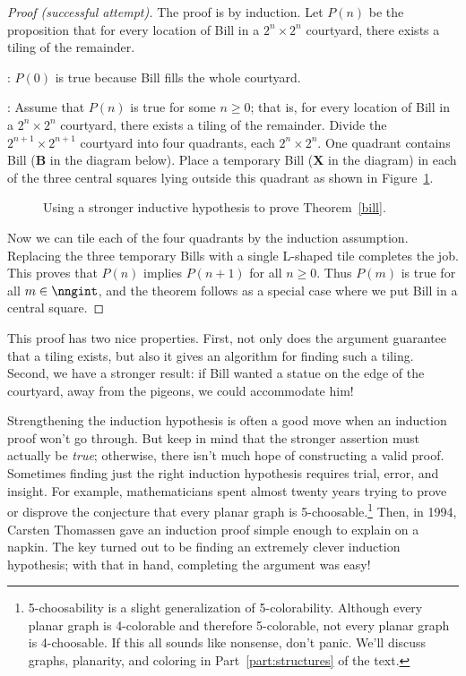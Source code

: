 \begin{proof}[Proof (successful attempt)]
The proof is by induction.  Let $P(n)$ be the proposition that for
every location of Bill in a $2^n \times 2^n$ courtyard, there exists a
tiling of the remainder.

: $P(0)$ is true because Bill fills the
whole courtyard.

: Assume that $P(n)$ is true for some
$n \geq 0$; that is, for every location of Bill in a $2^n \times 2^n$
courtyard, there exists a tiling of the remainder.  Divide the
$2^{n+1} \times 2^{n+1}$ courtyard into four quadrants, each $2^n
\times 2^n$.  One quadrant contains Bill (\textbf{B} in the diagram
below).  Place a temporary Bill (\textbf{X} in the diagram) in each of
the three central squares lying outside this quadrant as shown in
Figure~\ref{fig:stronger-bill}.

\begin{figure}


\caption{Using a stronger inductive hypothesis to prove
  Theorem~\ref{bill}.}
\label{fig:stronger-bill}
\end{figure}

Now we can tile each of the four quadrants by the induction
assumption.  Replacing the three temporary Bills with a single
L-shaped tile completes the job.  This proves that $P(n)$ implies
$P(n+1)$ for all $n \geq 0$.  Thus $P(m)$ is true for all $m \in
\nngint$, and the theorem follows as a special case where we put
Bill in a central square.
\end{proof}

This proof has two nice properties.  First, not only does the argument
guarantee that a tiling exists, but also it gives an algorithm for
finding such a tiling.  Second, we have a stronger result: if Bill
wanted a statue on the edge of the courtyard, away from the pigeons,
we could accommodate him!

Strengthening the induction hypothesis is often a good move when an
induction proof won't go through.  But keep in mind that the stronger
assertion must actually be \emph{true}; otherwise, there isn't much
hope of constructing a valid proof.  Sometimes finding just the right
induction hypothesis requires trial, error, and insight.  For example,
mathematicians spent almost twenty years trying to prove or disprove
the conjecture that every planar graph is
5-choosable.\footnote{5-choosability is a slight generalization
  of 5-colorability.  Although every planar graph is 4-colorable and
  therefore 5-colorable, not every planar graph is 4-choosable.  If
  this all sounds like nonsense, don't panic.  We'll discuss graphs,
  planarity, and coloring in Part~\ref{part:structures} of the text.}
Then, in 1994, Carsten Thomassen gave an induction proof simple enough
to explain on a napkin.  The key turned out to be finding an extremely
clever induction hypothesis; with that in hand, completing the
argument was easy!

